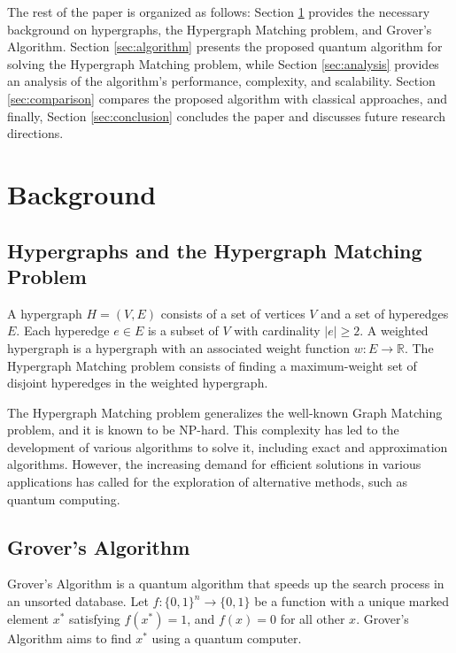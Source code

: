 The rest of the paper is organized as follows: Section \ref{sec:background} provides the necessary background on hypergraphs, the Hypergraph Matching problem, and Grover's Algorithm. Section \ref{sec:algorithm} presents the proposed quantum algorithm for solving the Hypergraph Matching problem, while Section \ref{sec:analysis} provides an analysis of the algorithm's performance, complexity, and scalability. Section \ref{sec:comparison} compares the proposed algorithm with classical approaches, and finally, Section \ref{sec:conclusion} concludes the paper and discusses future research directions.

\section{Background}
\label{sec:background}

\subsection{Hypergraphs and the Hypergraph Matching Problem}

A hypergraph $H = (V, E)$ consists of a set of vertices $V$ and a set of hyperedges $E$. Each hyperedge $e \in E$ is a subset of $V$ with cardinality $|e| \geq 2$. A weighted hypergraph is a hypergraph with an associated weight function $w: E \rightarrow \mathbb{R}$. The Hypergraph Matching problem consists of finding a maximum-weight set of disjoint hyperedges in the weighted hypergraph.

The Hypergraph Matching problem generalizes the well-known Graph Matching problem, and it is known to be NP-hard. This complexity has led to the development of various algorithms to solve it, including exact and approximation algorithms. However, the increasing demand for efficient solutions in various applications has called for the exploration of alternative methods, such as quantum computing.

\subsection{Grover's Algorithm}

Grover's Algorithm is a quantum algorithm that speeds up the search process in an unsorted database. Let $f: \{0, 1\}^n \rightarrow \{0, 1\}$ be a function with a unique marked element $x^*$ satisfying $f(x^*) = 1$, and $f(x) = 0$ for all other $x$. Grover's Algorithm aims to find $x^*$ using a quantum computer.


